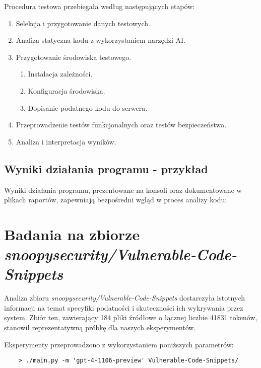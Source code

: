 Procedura testowa przebiegała według następujących etapów:
\begin{enumerate}
    \item Selekcja i przygotowanie danych testowych.
    \item Analiza statyczna kodu z wykorzystaniem narzędzi AI.
    \item Przygotowanie środowiska testowego.
    \begin{enumerate}
        \item Instalacja zależności.
        \item Konfiguracja środowiska.
        \item Dopisanie podatnego kodu do serwera.
    \end{enumerate} 
    \item Przeprowadzenie testów funkcjonalnych oraz testów bezpieczeństwa.
    \item Analiza i interpretacja wyników.
\end{enumerate}

\subsection{Wyniki działania programu - przykład}
\label{subsec:wyniki_dzialania_programu}

Wyniki działania programu, prezentowane na konsoli oraz dokumentowane w plikach raportów, zapewniają bezpośredni wgląd w proces analizy kodu:





\section{Badania na zbiorze \textit{snoopysecurity/Vulnerable-Code-Snippets}}
\label{sec:badania_na_zbiorze_snoopysecurity}

Analiza zbioru \textit{snoopysecurity/Vulnerable-Code-Snippets} dostarczyła istotnych informacji na temat specyfiki podatności i skuteczności ich wykrywania przez system. Zbiór ten, zawierający 184 pliki źródłowe o łącznej liczbie 41831 tokenów, stanowił reprezentatywną próbkę dla naszych eksperymentów.

Eksperymenty przeprowadzono z wykorzystaniem poniższych parametrów:
\begin{verbatim}
    > ./main.py -m 'gpt-4-1106-preview' Vulnerable-Code-Snippets/
\end{verbatim}



